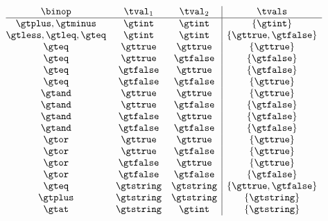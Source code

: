 \documentclass[nocopyright]{sigplanconf}
\begin{document}
\begin{center}
    \begin{math}
        \begin{array}{@{}c c c | c}
            \binop & \tval_1 & \tval_2 & \tvals
            \\\hline
            \gtplus, \gtminus &         \gtint & \gtint &       \{\gtint\}                      \\
            \gtless, \gtleq, \gteq &    \gtint & \gtint &       \{\gttrue, \gtfalse\}           \\
            \gteq &                     \gttrue & \gttrue &     \{\gttrue\}                     \\
            \gteq &                     \gttrue & \gtfalse &    \{\gtfalse\}                    \\
            \gteq &                     \gtfalse & \gttrue &    \{\gtfalse\}                    \\
            \gteq &                     \gtfalse & \gtfalse &   \{\gttrue\}                     \\
            \gtand &                    \gttrue & \gttrue &     \{\gttrue\}                     \\
            \gtand &                    \gttrue & \gtfalse &    \{\gtfalse\}                    \\
            \gtand &                    \gtfalse & \gttrue &    \{\gtfalse\}                    \\
            \gtand &                    \gtfalse & \gtfalse &   \{\gtfalse\}                    \\
            \gtor &                     \gttrue & \gttrue &     \{\gttrue\}                     \\
            \gtor &                     \gttrue & \gtfalse &    \{\gttrue\}                     \\
            \gtor &                     \gtfalse & \gttrue &    \{\gttrue\}                     \\
            \gtor &                     \gtfalse & \gtfalse &   \{\gtfalse\}                    \\
            \gteq &                     \gtstring & \gtstring & \{\gttrue, \gtfalse\}           \\
            \gtplus &                   \gtstring & \gtstring & \{\gtstring\}                   \\
            \gtat &                     \gtstring & \gtint &    \{\gtstring\}                   \\
        \end{array}
    \end{math}
\end{center}
\end{document}
